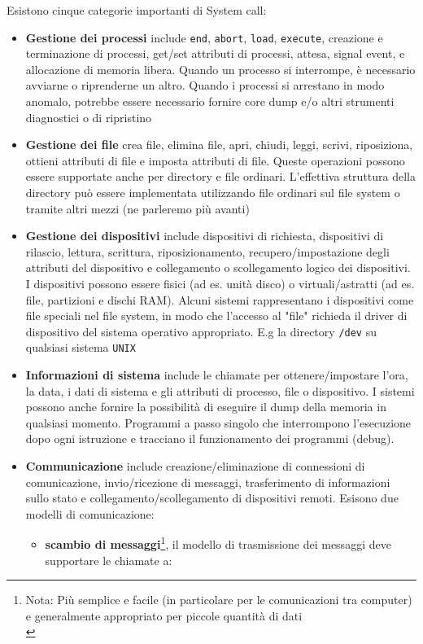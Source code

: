 \documentclass{article}
\begin{document}
Esistono cinque categorie importanti di System call:
\begin{itemize}
    \item \textbf{Gestione dei processi} include \texttt{end}, \texttt{abort}, \texttt{load}, \texttt{execute}, creazione e terminazione di processi, get/set attributi di processi, attesa, signal event, e allocazione di memoria libera. Quando un processo si interrompe, è necessario avviarne o riprenderne un altro. Quando i processi si arrestano in modo anomalo, potrebbe essere necessario fornire core dump e/o altri strumenti diagnostici o di ripristino
    \item \textbf{Gestione dei file} crea file, elimina file, apri, chiudi, leggi, scrivi, riposiziona, ottieni attributi di file e imposta attributi di file. Queste operazioni possono essere supportate anche per directory e file ordinari. L'effettiva struttura della directory può essere implementata utilizzando file ordinari sul file system o tramite altri mezzi (ne parleremo più avanti)
    \item \textbf{Gestione dei dispositivi} include dispositivi di richiesta, dispositivi di rilascio, lettura, scrittura, riposizionamento, recupero/impostazione degli attributi del dispositivo e collegamento o scollegamento logico dei dispositivi. I dispositivi possono essere fisici (ad es. unità disco) o virtuali/astratti (ad es. file, partizioni e dischi RAM). Alcuni sistemi rappresentano i dispositivi come file speciali nel file system, in modo che l'accesso al "file" richieda il driver di dispositivo del sistema operativo appropriato. E.g la directory \texttt{/dev} su qualsiasi sistema \texttt{UNIX}
    \item \textbf{Informazioni di sistema} include le chiamate per ottenere/impostare l'ora, la data, i dati di sistema e gli attributi di processo, file o dispositivo. I sistemi possono anche fornire la possibilità di eseguire il dump della memoria in qualsiasi momento. Programmi a passo singolo che interrompono l'esecuzione dopo ogni istruzione e tracciano
    il funzionamento dei programmi (debug). 
    \item \textbf{Communicazione} include creazione/eliminazione di connessioni di comunicazione, invio/ricezione di messaggi, trasferimento di informazioni sullo stato e collegamento/scollegamento di dispositivi remoti. Esisono due modelli di comunicazione: 
    \begin{itemize}
        \item \textbf{scambio di messaggi}\footnote{Nota: Più semplice e facile (in particolare per le comunicazioni tra computer) e generalmente appropriato per piccole quantità di dati\\}, il modello di trasmissione dei messaggi deve supportare le chiamate a:

\end{itemize}
\end{itemize}
\end{document}
